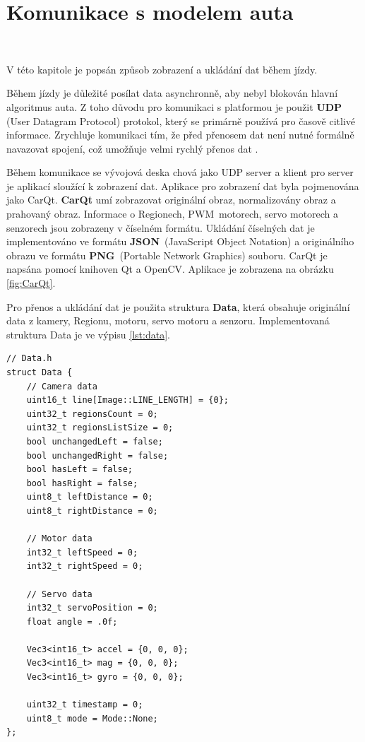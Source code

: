 \chapter{Komunikace s modelem auta}
\label{sec:PlatformCommunication}
\

V této kapitole je popsán způsob zobrazení a ukládání dat během jízdy.

Během jízdy je důležité posílat data asynchronně, aby nebyl blokován hlavní
algoritmus auta. Z toho důvodu pro komunikaci s platformou je použit \textbf{UDP}
(User Datagram Protocol) protokol, který se primárně používá pro časově citlivé
informace. Zrychluje komunikaci tím, že před přenosem dat není nutné formálně
navazovat spojení, což umožňuje velmi rychlý přenos dat \cite{UDP}.

Během komunikace se vývojová deska chová jako UDP server a klient pro server je
aplikací sloužící k zobrazení dat. Aplikace pro zobrazení dat byla pojmenována jako
CarQt. \textbf{CarQt} umí zobrazovat originální obraz, normalizovány obraz a
prahovaný obraz. Informace o Regionech, PWM~motorech, servo motorech a senzorech
jsou zobrazeny v číselném formátu. Ukládání číselných dat je implementováno ve
formátu \textbf{JSON}~(JavaScript Object Notation) a originálního obrazu ve formátu
\textbf{PNG}~(Portable Network Graphics) souboru. CarQt je napsána pomocí knihoven
Qt a OpenCV. Aplikace je zobrazena na obrázku \ref{fig:CarQt}.

Pro přenos a ukládání dat je použita struktura \textbf{Data}, která obsahuje
originální data z kamery, Regionu, motoru, servo motoru a senzoru.
Implementovaná struktura Data je ve výpisu \ref{lst:data}.
\begin{lstlisting}[caption = Struktura Data, label = lst:data]
// Data.h
struct Data {
    // Camera data
    uint16_t line[Image::LINE_LENGTH] = {0};
    uint32_t regionsCount = 0;
    uint32_t regionsListSize = 0;
    bool unchangedLeft = false;
    bool unchangedRight = false;
    bool hasLeft = false;
    bool hasRight = false;
    uint8_t leftDistance = 0;
    uint8_t rightDistance = 0;

    // Motor data
    int32_t leftSpeed = 0;
    int32_t rightSpeed = 0;

    // Servo data
    int32_t servoPosition = 0;
    float angle = .0f;

    Vec3<int16_t> accel = {0, 0, 0};
    Vec3<int16_t> mag = {0, 0, 0};
    Vec3<int16_t> gyro = {0, 0, 0};

    uint32_t timestamp = 0;
    uint8_t mode = Mode::None;
};
\end{lstlisting}

